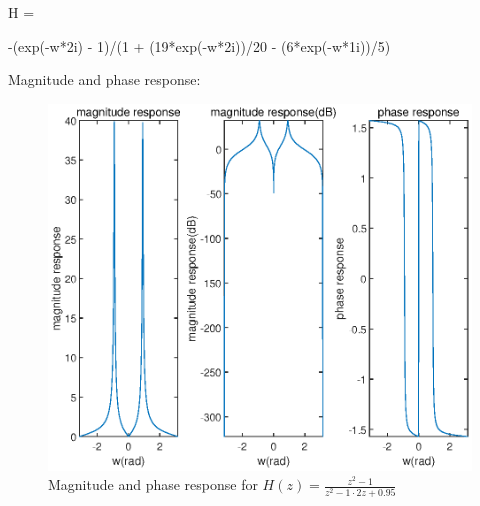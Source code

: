 \documentclass[onecolumn,oneside]{SUSTechHomework}
\begin{document}
\begin{itemize}
\begin{commandline}
     
    H =
     
    -(exp(-w*2i) - 1)/(1 + (19*exp(-w*2i))/20 - (6*exp(-w*1i))/5)
\end{commandline}
    Magnitude and phase response:
    \begin{figure}[H]
        \centering
        \includegraphics[width=140mm]{pictures/q6_2_3(b).eps}
        \caption{Magnitude and phase response for $H(z)=\frac{z^{2}-1}{z^{2}-1 \cdot 2 z+0.95}$}
    \end{figure}
\end{itemize}
\end{document}

